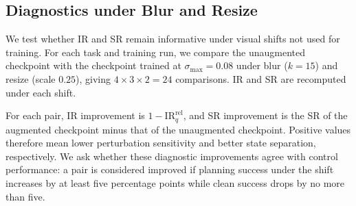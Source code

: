 \documentclass{article}
\newcommand{\stdmax}{\ensuremath{\sigma_{\max}}}
\begin{document}






\subsection{Diagnostics under Blur and Resize}
\label{sec:exp-cross-stressor}

We test whether IR and SR remain informative under visual shifts not used for
training. For each task and training run, we compare the unaugmented checkpoint
with the checkpoint trained at $\stdmax{}=0.08$ under blur ($k=15$) and resize
(scale $0.25$), giving $4\times3\times2=24$ comparisons. IR and SR are
recomputed under each shift.

For each pair, IR improvement is
$1-\mathrm{IR}^{\mathrm{rel}}_q$, and SR improvement is the SR of the augmented
checkpoint minus that of the unaugmented checkpoint. Positive values therefore
mean lower perturbation sensitivity and better state separation, respectively.
We ask whether these diagnostic improvements agree with control performance:
a pair is considered improved if planning success under the shift increases by
at least five percentage points while clean success drops by no more than five.
\end{document}
